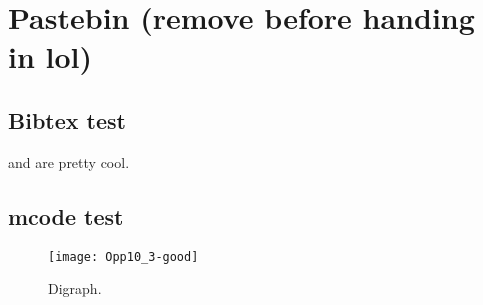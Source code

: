 \section{Pastebin (remove before handing in lol)}

\subsection{Bibtex test}
\cite{nocedal_numerical_2006} and \cite{_helicopter_2015} are pretty cool.

\subsection{mcode test}


\begin{figure}[H]
	\centering
	\texttt{[image: Opp10\_3-good]}
	\caption{Digraph.}
	\label{fig:digraph}
\end{figure}
